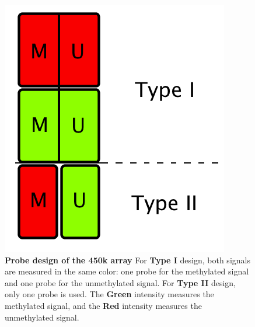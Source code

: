 \documentclass[12pt]{article}
\begin{document}
 \begin{figure}
\centering
\includegraphics[scale=0.20]{images/designNew.png}
\caption{\textbf{Probe design of the 450k array} For \textbf{Type I} design, both signals are measured in the same color: one probe for the methylated signal and one probe for the unmethylated signal. For \textbf{Type II} design, only one probe is used. The  \textbf{\textcolor[rgb]{0,0.6,0}{Green}} intensity measures the methylated signal, and the  \textbf{\textcolor[rgb]{0.7,0,0}{Red}} intensity measures the unmethylated signal. 
 }
\end{figure}
\end{document}
